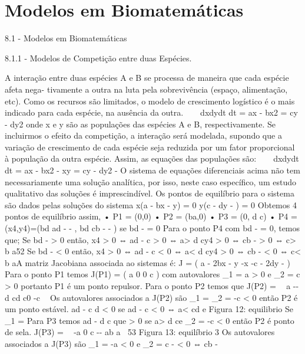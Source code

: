 {{{{{{{{{{{{{{{{{{\chapter{Modelos em Biomatemáticas}

8.1 - Modelos em Biomatemáticas 

8.1.1 - Modelos de Competição entre duas Espécies. 

A interação entre duas espécies A e B se processa de maneira que cada espécie afeta nega- tivamente a outra na luta pela sobrevivência (espaço, alimentação, etc). Como os recursos são limitados, o modelo de crescimento logístico é o mais indicado para cada espécie, na ausência da outra.  
dxdydt dt = ax - bx2 = cy - dy2 
onde x e y são as populações das espécies A e B, respectivamente. Se incluirmos o efeito da competição, a interação será modelada, supondo que a variação de crescimento de cada espécie seja reduzida por um fator proporcional à população da outra espécie. Assim, as equações das populações são:  
dxdydt dt = ax - bx2 - \alpha xy = cy - dy2 - \betaxy 
O sistema de equações diferenciais acima não tem necessariamente uma solução analítica, por isso, neste caso específico, um estudo qualitativo das soluções é imprescindível. 
Os pontos de equilíbrio para o sistema são dados pelas soluções do sistema 
{ x(a - bx - \alpha y) = 0 y(c - dy - \betax) = 0 
Obtemos 4 pontos de equilíbrio assim, 
• P1 = (0,0) 
• P2 = (ba,0) 
• P3 = (0, d c) 
• P4 = (x4,y4)=(bd ad - - \alpha \betac\alpha  
, bd cb - - \alpha \betaa\beta 
) se bd - \alpha \beta = 0 
Para o ponto P4 com bd - \alpha \beta = 0, temos que; Se bd - \alpha \beta > 0 então, 
x4 > 0 ⇔ ad - \alpha c > 0 ⇔ \alpha  a> d cy4 > 0 ⇔ cb - \betaa > 0 ⇔ c\beta > b a52 
Se bd - \alpha \beta < 0 então, 
x4 > 0 ⇔ ad - \alpha c < 0 ⇔ \alpha  a< d cy4 > 0 ⇔ cb - \betaa < 0 ⇔ c\beta < b aA matriz Jacobiana associada ao sistemas é: 
J = 
( a - 2bx - \alpha y -\alpha x 
-\betay c - 2dy - \betax 
) 
Para o ponto P1 temos 
J(P1) = 
( a 0 0 c 
) 
com autovalores \lambda_{1} = a > 0 e \lambda_{2} = c > 0 portanto P1 é um ponto repulsor. 
Para o ponto P2 temos que 
J(P2) = 
 a -\beta- \alpha d cd c0 -c 
 
Os autovalores associados a J(P2) são \lambda_{1} = \lambda_{2} = -c < 0 então P2 é um ponto estável. 
ad - \alpha c 
d < 0 se ad - \alpha c < 0 ⇔ \alpha  a< cd e 
Figura 12: equilibrio 
Se \lambda_{1} = Para P3 temos ad - d \alpha c 
que 
> 0 se a\alpha  > d ce \lambda_{2} = -c < 0 então P2 é ponto de sela. 
J(P3) = 
 -a 0 c -\alpha - \betab ab a 
53 
Figura 13: equilíbrio 3 
Os autovalores associados a J(P3) são \lambda_{1} = -a < 0 e \lambda_{2} = c - \betaab < 0 ⇔ cb - \betaa 
}}}}}}}}}}}}}}}}}}}
